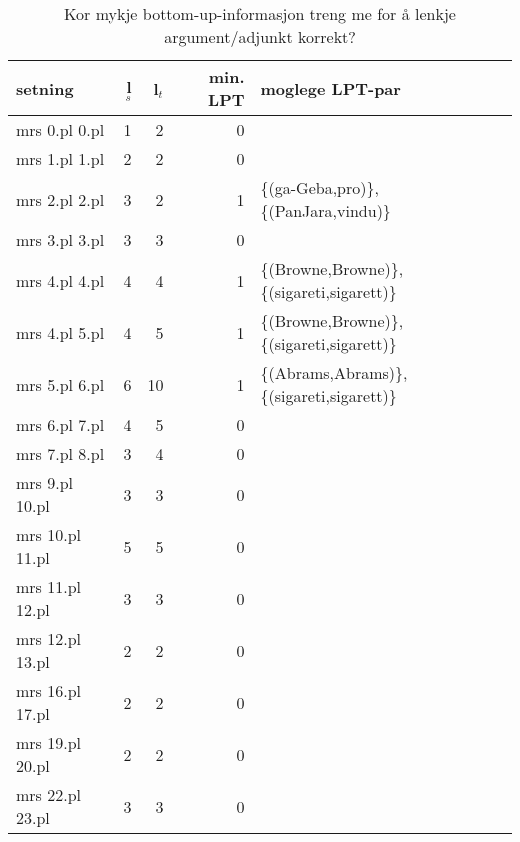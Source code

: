 \documentclass[11pt,a4paper,oneside,draft]{report}
\begin{document}
\begin{table}[htb]
\caption{\label{tbl:LPT}Kor mykje bottom-up-informasjon treng me for å lenkje argument/adjunkt korrekt?}
\begin{center}
\begin{tabular}{lrrrl}
 setning          &  l$_s$  &  l$_t$  &  min. LPT  &  moglege LPT-par                               \\
\hline
 mrs 0.pl 0.pl    &      1  &      2  &         0  &                                                \\
 mrs 1.pl 1.pl    &      2  &      2  &         0  &                                                \\
 mrs 2.pl 2.pl    &      3  &      2  &         1  &  \{(ga-Geba,pro)\}, \{(PanJara,vindu)\}        \\
 mrs 3.pl 3.pl    &      3  &      3  &         0  &                                                \\
 mrs 4.pl 4.pl    &      4  &      4  &         1  &  \{(Browne,Browne)\}, \{(sigareti,sigarett)\}  \\
 mrs 4.pl 5.pl    &      4  &      5  &         1  &  \{(Browne,Browne)\}, \{(sigareti,sigarett)\}  \\
 mrs 5.pl 6.pl    &      6  &     10  &         1  &  \{(Abrams,Abrams)\}, \{(sigareti,sigarett)\}  \\
 mrs 6.pl 7.pl    &      4  &      5  &         0  &                                                \\
 mrs 7.pl 8.pl    &      3  &      4  &         0  &                                                \\
 mrs 9.pl 10.pl   &      3  &      3  &         0  &                                                \\
 mrs 10.pl 11.pl  &      5  &      5  &         0  &                                                \\
 mrs 11.pl 12.pl  &      3  &      3  &         0  &                                                \\
 mrs 12.pl 13.pl  &      2  &      2  &         0  &                                                \\
 mrs 16.pl 17.pl  &      2  &      2  &         0  &                                                \\
 mrs 19.pl 20.pl  &      2  &      2  &         0  &                                                \\
 mrs 22.pl 23.pl  &      3  &      3  &         0  &                                                \\

\end{tabular}
\end{center}
\end{table}
\end{document}
